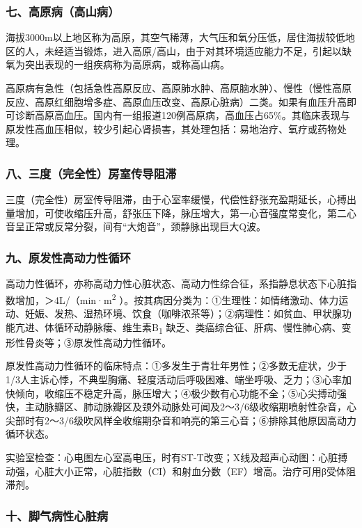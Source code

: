 \subsubsection{七、高原病（高山病）}

海拔3000m以上地区称为高原，其空气稀薄，大气压和氧分压低，居住海拔较低地区的人，未经适当锻炼，进入高原/高山，由于对其环境适应能力不足，引起以缺氧为突出表现的一组疾病称为高原病，或称高山病。

高原病有急性（包括急性高原反应、高原肺水肿、高原脑水肿）、慢性（慢性高原反应、高原红细胞增多症、高原血压改变、高原心脏病）二类。如果有血压升高即可诊断高原高血压。国内有一组报道120例高原病，高血压占65\%。其临床表现与原发性高血压相似，较少引起心肾损害，其处理包括：易地治疗、氧疗或药物处理。

\subsubsection{八、三度（完全性）房室传导阻滞}

三度（完全性）房室传导阻滞，由于心室率缓慢，代偿性舒张充盈期延长，心搏出量增加，可使收缩压升高，舒张压下降，脉压增大，第一心音强度常变化，第二心音呈正常或反常分裂，间有“大炮音”，颈静脉出现巨大Q波。

\subsubsection{九、原发性高动力性循环}

高动力性循环，亦称高动力性心脏状态、高动力性综合征，系指静息状态下心脏指数增加，＞4L/（min·m\textsuperscript{2}
）。按其病因分类为：①生理性：如情绪激动、体力运动、妊娠、发热、湿热环境、饮食（咖啡浓茶等）；②病理性：如贫血、甲状腺功能亢进、体循环动静脉瘘、维生素B\textsubscript{1}
缺乏、类癌综合征、肝病、慢性肺心病、变形性骨炎等；③原发性高动力性循环。

原发性高动力性循环的临床特点：①多发生于青壮年男性；②多数无症状，少于1/3人主诉心悸，不典型胸痛、轻度活动后呼吸困难、端坐呼吸、乏力；③心率加快倾向，收缩压不稳定升高，脉压增大；④极少数有心功能不全；⑤心尖搏动强快，主动脉瓣区、肺动脉瓣区及颈外动脉处可闻及2～3/6级收缩期喷射性杂音，心尖部时有2～3/6级吹风样全收缩期杂音和响亮的第三心音；⑥排除其他原因高动力循环状态。

实验室检查：心电图左心室高电压，时有ST-T改变；X线及超声心动图：心脏搏动强，心脏大小正常，心脏指数（CI）和射血分数（EF）增高。治疗可用β受体阻滞剂。

\subsubsection{十、脚气病性心脏病}

